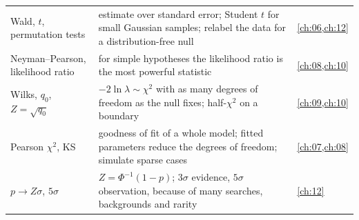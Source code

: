 \begin{center}
\begin{tabularx}{\linewidth}{@{}>{\raggedright\arraybackslash}p{3.3cm}
                               >{\raggedright\arraybackslash}X
                               >{\raggedright\arraybackslash}p{2.7cm}@{}}
Wald, $t$, permutation tests & estimate over standard error; Student $t$ for small Gaussian samples; relabel the data for a distribution-free null & \cref{ch:06,ch:12}\\
Neyman--Pearson, likelihood ratio & for simple hypotheses the likelihood ratio is the most powerful statistic & \cref{ch:08,ch:10}\\
Wilks, $q_0$, $Z=\sqrt{q_0}$ & $-2\ln\lambda\sim\chi^2$ with as many degrees of freedom as the null fixes; half-$\chi^2$ on a boundary & \cref{ch:09,ch:10}\\
Pearson $\chi^2$, KS & goodness of fit of a whole model; fitted parameters reduce the degrees of freedom; simulate sparse cases & \cref{ch:07,ch:08}\\
$p\to Z\sigma$, $5\sigma$ & $Z=\Phi^{-1}(1-p)$; $3\sigma$ evidence, $5\sigma$ observation, because of many searches, backgrounds and rarity & \cref{ch:12}\\
\bottomrule
\end{tabularx}
\end{center}


